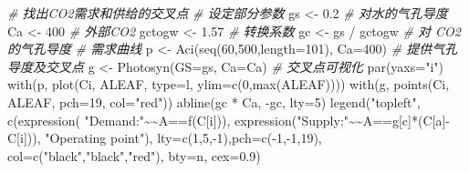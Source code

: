 \documentclass[
]{krantz}
\makeatletter
\newenvironment{Shaded}{\begin{snugshade}}{\end{snugshade}}
\newcommand{\AttributeTok}[1]{\textcolor[rgb]{0.77,0.63,0.00}{#1}}
\newcommand{\CommentTok}[1]{\textcolor[rgb]{0.56,0.35,0.01}{\textit{#1}}}
\newcommand{\DecValTok}[1]{\textcolor[rgb]{0.00,0.00,0.81}{#1}}
\newcommand{\ErrorTok}[1]{\textcolor[rgb]{0.64,0.00,0.00}{\textbf{#1}}}
\newcommand{\FloatTok}[1]{\textcolor[rgb]{0.00,0.00,0.81}{#1}}
\newcommand{\FunctionTok}[1]{\textcolor[rgb]{0.00,0.00,0.00}{#1}}
\newcommand{\NormalTok}[1]{#1}
\newcommand{\OtherTok}[1]{\textcolor[rgb]{0.56,0.35,0.01}{#1}}
\newcommand{\SpecialCharTok}[1]{\textcolor[rgb]{0.00,0.00,0.00}{#1}}
\newcommand{\StringTok}[1]{\textcolor[rgb]{0.31,0.60,0.02}{#1}}
\newenvironment{kframe}{%
\medskip{}
\setlength{\fboxsep}{.8em}
 \def\at@end@of@kframe{}%
 \ifinner\ifhmode%
  \def\at@end@of@kframe{\end{minipage}}%
  \begin{minipage}{\columnwidth}%
 \fi\fi%
 \def\FrameCommand##1{\hskip\@totalleftmargin \hskip-\fboxsep
 \colorbox{shadecolor}{##1}\hskip-\fboxsep
     \hskip-\linewidth \hskip-\@totalleftmargin \hskip\columnwidth}%
 \MakeFramed {\advance\hsize-\width
   \@totalleftmargin\z@ \linewidth\hsize
   \@setminipage}}%
 {\par\unskip\endMakeFramed%
 \at@end@of@kframe}
\renewenvironment{Shaded}{\begin{kframe}}{\end{kframe}}
\makeatother
\begin{document}
\begin{Shaded}
\begin{Highlighting}[]
\CommentTok{\# 找出CO2需求和供给的交叉点}
\CommentTok{\# 设定部分参数}
\NormalTok{gs }\OtherTok{\textless{}{-}} \FloatTok{0.2} \CommentTok{\# 对水的气孔导度}
\NormalTok{Ca }\OtherTok{\textless{}{-}} \DecValTok{400} \CommentTok{\# 外部CO2}
\NormalTok{gctogw }\OtherTok{\textless{}{-}} \FloatTok{1.57} \CommentTok{\# 转换系数}
\NormalTok{gc }\OtherTok{\textless{}{-}}\NormalTok{ gs }\SpecialCharTok{/}\NormalTok{ gctogw }\CommentTok{\# 对 CO2 的气孔导度}
\CommentTok{\# 需求曲线}
\NormalTok{p }\OtherTok{\textless{}{-}} \FunctionTok{Aci}\NormalTok{(}\FunctionTok{seq}\NormalTok{(}\DecValTok{60}\NormalTok{,}\DecValTok{500}\NormalTok{,}\AttributeTok{length=}\DecValTok{101}\NormalTok{), }\AttributeTok{Ca=}\DecValTok{400}\NormalTok{)}
\CommentTok{\# 提供气孔导度及交叉点}
\NormalTok{g }\OtherTok{\textless{}{-}} \FunctionTok{Photosyn}\NormalTok{(}\AttributeTok{GS=}\NormalTok{gs, }\AttributeTok{Ca=}\NormalTok{Ca)}
\CommentTok{\# 交叉点可视化}
\FunctionTok{par}\NormalTok{(}\AttributeTok{yaxs=}\StringTok{"i"}\NormalTok{)}
\FunctionTok{with}\NormalTok{(p, }\FunctionTok{plot}\NormalTok{(Ci, ALEAF, }\AttributeTok{type=}\StringTok{\textquotesingle{}l\textquotesingle{}}\NormalTok{, }
             \AttributeTok{ylim=}\FunctionTok{c}\NormalTok{(}\DecValTok{0}\NormalTok{,}\FunctionTok{max}\NormalTok{(ALEAF))))}
\FunctionTok{with}\NormalTok{(g, }\FunctionTok{points}\NormalTok{(Ci, ALEAF, }\AttributeTok{pch=}\DecValTok{19}\NormalTok{, }\AttributeTok{col=}\StringTok{"red"}\NormalTok{))}
\FunctionTok{abline}\NormalTok{(gc }\SpecialCharTok{*}\NormalTok{ Ca, }\SpecialCharTok{{-}}\NormalTok{gc, }\AttributeTok{lty=}\DecValTok{5}\NormalTok{)}
\FunctionTok{legend}\NormalTok{(}\StringTok{"topleft"}\NormalTok{, }\FunctionTok{c}\NormalTok{(}\FunctionTok{expression}\NormalTok{(}
  \StringTok{"Demand:"}\SpecialCharTok{\textasciitilde{}}\ErrorTok{\textasciitilde{}}\NormalTok{A}\SpecialCharTok{==}\FunctionTok{f}\NormalTok{(C[i])),}
   \FunctionTok{expression}\NormalTok{(}\StringTok{"Supply:"}\SpecialCharTok{\textasciitilde{}}\ErrorTok{\textasciitilde{}}\NormalTok{A}\SpecialCharTok{==}\NormalTok{g[c]}\SpecialCharTok{*}\NormalTok{(C[a]}\SpecialCharTok{{-}}\NormalTok{C[i])),}
              \StringTok{"Operating point"}\NormalTok{),}
   \AttributeTok{lty=}\FunctionTok{c}\NormalTok{(}\DecValTok{1}\NormalTok{,}\DecValTok{5}\NormalTok{,}\SpecialCharTok{{-}}\DecValTok{1}\NormalTok{),}\AttributeTok{pch=}\FunctionTok{c}\NormalTok{(}\SpecialCharTok{{-}}\DecValTok{1}\NormalTok{,}\SpecialCharTok{{-}}\DecValTok{1}\NormalTok{,}\DecValTok{19}\NormalTok{),}
   \AttributeTok{col=}\FunctionTok{c}\NormalTok{(}\StringTok{"black"}\NormalTok{,}\StringTok{"black"}\NormalTok{,}\StringTok{"red"}\NormalTok{),}
   \AttributeTok{bty=}\StringTok{\textquotesingle{}n\textquotesingle{}}\NormalTok{, }\AttributeTok{cex=}\FloatTok{0.9}\NormalTok{)}
\end{Highlighting}
\end{Shaded}
\end{document}
